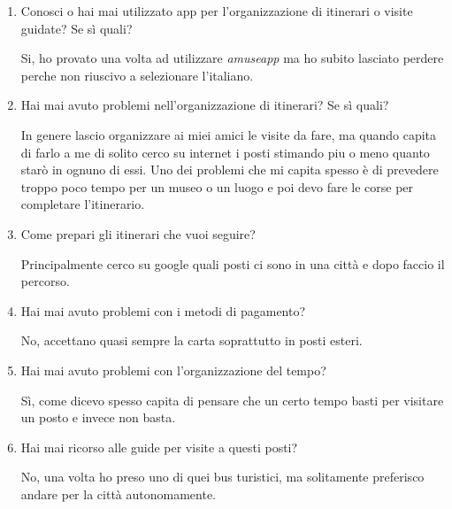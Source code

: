 \clearpage
{}

\begin{enumerate}

\item Conosci o hai mai utilizzato app per l'organizzazione di itinerari o visite guidate? Se sì quali?

Si, ho provato una volta ad utilizzare \emph{amuseapp} ma ho subito lasciato perdere perche non riuscivo a selezionare l'italiano.

\item Hai mai avuto problemi nell'organizzazione di itinerari? Se sì quali?

In genere lascio organizzare ai miei amici le visite da fare, ma quando capita di farlo a me di solito cerco su internet i posti stimando piu o meno quanto starò in ognuno di essi.
Uno dei problemi che mi capita spesso è di prevedere troppo poco tempo per un museo o un luogo e poi devo fare le corse per completare l'itinerario.

\item Come prepari gli itinerari che vuoi seguire?

Principalmente cerco su  google quali posti ci sono in una città e dopo faccio il percorso.

\item Hai mai avuto problemi con i metodi di pagamento?

No, accettano quasi sempre la carta soprattutto in posti esteri.

\item Hai mai avuto problemi con l'organizzazione del tempo?

Sì, come dicevo spesso capita di pensare che un certo tempo basti per visitare un posto e invece non basta.

\item Hai mai ricorso alle guide per visite a questi posti?

No, una volta ho preso uno di quei bus turistici, ma solitamente preferisco andare per la città autonomamente.


\end{enumerate}


\markright{}
